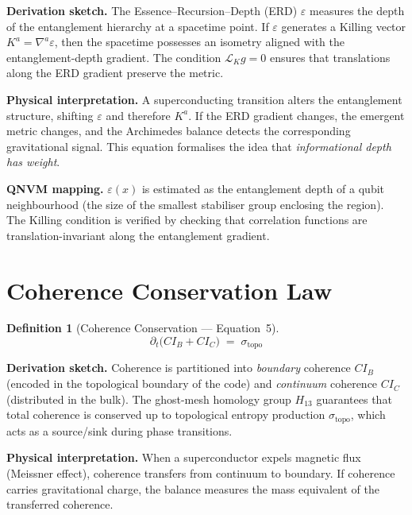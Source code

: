 \documentclass[11pt,a4paper]{article}
\newtheorem{definition}{Definition}[section]
\theoremstyle{remark}
\newcommand{\Lop}{\mathcal{L}}
\begin{document}
\textbf{Derivation sketch.}\quad
The Essence--Recursion--Depth (ERD) $\varepsilon$ measures the depth of the entanglement hierarchy at a spacetime point.  If $\varepsilon$ generates a Killing vector $K^a = \nabla^a\varepsilon$, then the spacetime possesses an isometry aligned with the entanglement-depth gradient.  The condition $\Lop_K g=0$ ensures that translations along the ERD gradient preserve the metric.

\textbf{Physical interpretation.}\quad
A superconducting transition alters the entanglement structure, shifting $\varepsilon$ and therefore $K^a$.  If the ERD gradient changes, the emergent metric changes, and the Archimedes balance detects the corresponding gravitational signal.  This equation formalises the idea that \emph{informational depth has weight}.

\textbf{QNVM mapping.}\quad
$\varepsilon(x)$ is estimated as the entanglement depth of a qubit neighbourhood (the size of the smallest stabiliser group enclosing the region).  The Killing condition is verified by checking that correlation functions are translation-invariant along the entanglement gradient.

\section{Coherence Conservation Law}
\label{sec:eq5}

\begin{definition}[Coherence Conservation --- Equation~5]
\begin{equation}\label{eq:coherence}
    \partial_t\!\bigl(CI_B + CI_C\bigr) \;=\; \sigma_{\text{topo}}
\end{equation}
\end{definition}

\textbf{Derivation sketch.}\quad
Coherence is partitioned into \emph{boundary} coherence $CI_B$ (encoded in the topological boundary of the code) and \emph{continuum} coherence $CI_C$ (distributed in the bulk).  The ghost-mesh homology group $H_{13}$ guarantees that total coherence is conserved up to topological entropy production $\sigma_{\text{topo}}$, which acts as a source/sink during phase transitions.

\textbf{Physical interpretation.}\quad
When a superconductor expels magnetic flux (Meissner effect), coherence transfers from continuum to boundary.  If coherence carries gravitational charge, the balance measures the mass equivalent of the transferred coherence.
\end{document}
